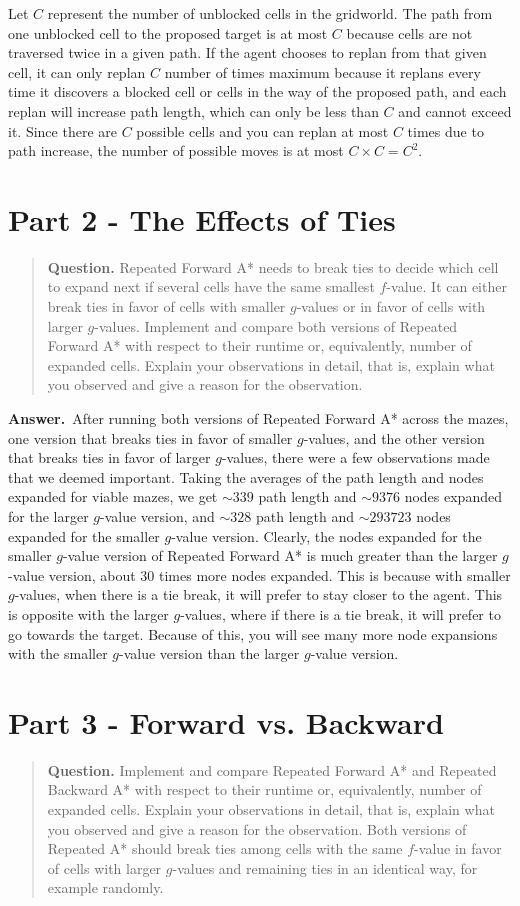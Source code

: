 \documentclass[11pt]{article}
\newcommand{\question}[1]{%
\begin{quote}
\textbf{Question.} #1
\end{quote}
}
\newcommand{\answer}{\textbf{Answer.}\ }
\begin{document}
Let \(C\) represent the number of unblocked cells in the gridworld. The path from one unblocked cell to the proposed target is at most \(C\) because cells are not traversed twice in a given path. If the agent chooses to replan from that given cell, it can only replan \(C\) number of times maximum because it replans every time it discovers a blocked cell or cells in the way of the proposed path, and each replan will increase path length, which can only be less than \(C\) and cannot exceed it. Since there are \(C\) possible cells and you can replan at most \(C\) times due to path increase, the number of possible moves is at most \(C \times C = C^2\).

\section*{Part 2 - The Effects of Ties }
\question{Repeated Forward A* needs to break ties to decide which cell to expand next if several cells have the same smallest \(f\)-value. It can either break ties in favor of cells with smaller \(g\)-values or in favor of cells with larger \(g\)-values. Implement and compare both versions of Repeated Forward A* with respect to their runtime or, equivalently, number of expanded cells. Explain your observations in detail, that is, explain what you observed and give a reason for the observation.}

\answer After running both versions of Repeated Forward A* across the mazes, one version that breaks ties in favor of smaller \(g\)-values, and the other version that breaks ties in favor of larger \(g\)-values, there were a few observations made that we deemed important. Taking the averages of the path length and nodes expanded for viable mazes, we get \(\sim 339\) path length and \(\sim 9376\) nodes expanded for the larger \(g\)-value version, and \(\sim 328\) path length and \(\sim 293723\) nodes expanded for the smaller \(g\)-value version. Clearly, the nodes expanded for the smaller \(g\)-value version of Repeated Forward A* is much greater than the larger \(g\)-value version, about 30 times more nodes expanded. This is because with smaller \(g\)-values, when there is a tie break, it will prefer to stay closer to the agent. This is opposite with the larger \(g\)-values, where if there is a tie break, it will prefer to go towards the target. Because of this, you will see many more node expansions with the smaller \(g\)-value version than the larger \(g\)-value version.

\section*{Part 3 - Forward vs. Backward}
\question{Implement and compare Repeated Forward A* and Repeated Backward A* with respect to their runtime or, equivalently, number of expanded cells. Explain your observations in detail, that is, explain what you observed and give a reason for the observation. Both versions of Repeated A* should break ties among cells with the same \(f\)-value in favor of cells with larger \(g\)-values and remaining ties in an identical way, for example randomly.}
\end{document}
